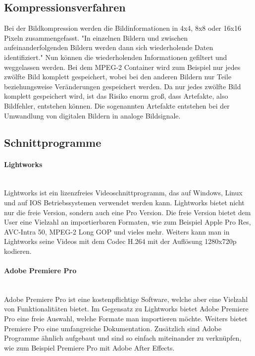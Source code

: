 \subsection{Kompressionsverfahren}
Bei der Bildkompression werden die Bildinformationen in 4x4, 8x8 oder 16x16 Pixeln zusammengefasst. "In einzelnen Bildern und zwischen aufeinanderfolgenden Bildern werden dann sich wiederholende Daten identifiziert." Nun können die wiederholenden Informationen gefiltert und weggelassen werden. Bei dem MPEG-2 Container wird zum Beispiel nur jedes zwölfte Bild komplett gespeichert, wobei bei den anderen Bildern nur Teile beziehungsweise Veränderungen gespeichert werden. Da nur jedes zwölfte Bild komplett gespeichert wird, ist das Risiko enorm groß, dass Artefakte, also Bildfehler, entstehen können. Die sogenannten Artefakte entstehen bei der Umwandlung von digitalen Bildern in analoge Bildsignale. 
\subsection{Schnittprogramme}
\paragraph{Lightworks}
\leavevmode \\
Lightworks ist ein lizenzfreies Videoschnittprogramm, das auf Windows, Linux und auf IOS Betriebssystemen verwendet werden kann. Lightworks bietet nicht nur die freie Version, sondern auch eine Pro Version. Die freie Version bietet dem User eine Vielzahl an importierbaren Formaten, wie zum Beispiel Apple Pro Res, AVC-Intra 50, MPEG-2 Long GOP und vieles mehr. Weiters kann man in Lightworks seine Videos mit dem Codec H.264 mit der Auflösung 1280x720p kodieren. 
\paragraph{Adobe Premiere Pro}
\leavevmode \\
Adobe Premiere Pro ist eine kostenpflichtige Software, welche aber eine Vielzahl von Funktionalitäten bietet. Im Gegensatz zu Lightworks bietet Adobe Premiere Pro eine freie Auswahl, welche Formate man importieren möchte. Weiters bietet Premiere Pro eine umfangreiche Dokumentation. Zusätzlich sind Adobe Programme ähnlich aufgebaut und sind so einfach miteinander zu verknüpfen, wie zum Beispiel Premiere Pro mit Adobe After Effects. 
